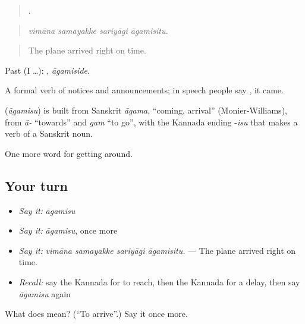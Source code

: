 \begin{quote}
   .
\end{quote}

\begin{quote}
\emph{vimāna samayakke sariyāgi āgamisitu.}
\end{quote}

\begin{quote}
The plane arrived right on time.
\end{quote}

Past (I …): , \emph{āgamiside}.

A formal verb of notices and announcements; in speech people say , it came.

\begin{cousinweb}
\textbf{} (\emph{āgamisu}) is built from Sanskrit \emph{āgama}, \textquotedblleft{}coming, arrival\textquotedblright{} (Monier-Williams), from \emph{ā-} \textquotedblleft{}towards\textquotedblright{} and \emph{gam} \textquotedblleft{}to go\textquotedblright{}, with the Kannada ending -\emph{isu} that makes a verb of a Sanskrit noun.
\end{cousinweb}

\begin{grammarlens}[title={What you've built}]
One more word for getting around.
\end{grammarlens}

\subsection*{Your turn}
\begin{itemize}
\raggedright
  \item \emph{Say it:} \emph{āgamisu}
  \item \emph{Say it:} \emph{āgamisu}, once more
  \item \emph{Say it:} \emph{vimāna samayakke sariyāgi āgamisitu.} — The plane arrived right on time.
  \item \emph{Recall:} say the Kannada for to reach, then the Kannada for a delay, then say \emph{āgamisu} again
\end{itemize}

\begin{tcolorbox}[breakable,colback=teal!4,colframe=teal!35!black,title={Before you move on}]
What does  mean? (\textquotedblleft{}To arrive\textquotedblright{}.) Say it once more.
\end{tcolorbox}
